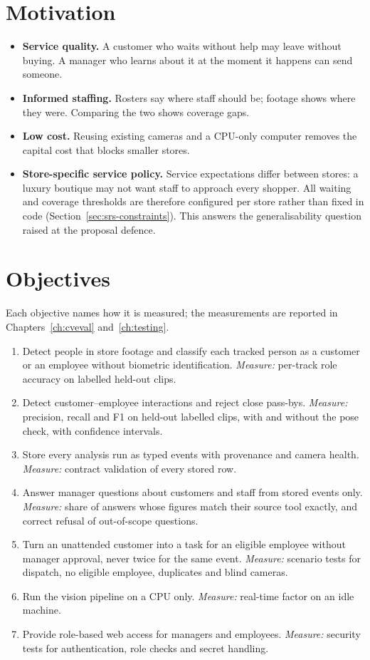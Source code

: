 \section{Motivation}
\begin{itemize}
\item \textbf{Service quality.} A customer who waits without help may leave without buying. A manager who learns about it at the moment it happens can send someone.
\item \textbf{Informed staffing.} Rosters say where staff should be; footage shows where they were. Comparing the two shows coverage gaps.
\item \textbf{Low cost.} Reusing existing cameras and a CPU-only computer removes the capital cost that blocks smaller stores.
\item \textbf{Store-specific service policy.} Service expectations differ between stores: a luxury boutique may not want staff to approach every shopper. All waiting and coverage thresholds are therefore configured per store rather than fixed in code (Section~\ref{sec:srs-constraints}). This answers the generalisability question raised at the proposal defence.
\end{itemize}

\section{Objectives}
Each objective names how it is measured; the measurements are reported in Chapters~\ref{ch:cveval} and~\ref{ch:testing}.
\begin{enumerate}[label=O\arabic*.]
\item Detect people in store footage and classify each tracked person as a customer or an employee without biometric identification. \emph{Measure:} per-track role accuracy on labelled held-out clips.
\item Detect customer--employee interactions and reject close pass-bys. \emph{Measure:} precision, recall and F1 on held-out labelled clips, with and without the pose check, with confidence intervals.
\item Store every analysis run as typed events with provenance and camera health. \emph{Measure:} contract validation of every stored row.
\item Answer manager questions about customers and staff from stored events only. \emph{Measure:} share of answers whose figures match their source tool exactly, and correct refusal of out-of-scope questions.
\item Turn an unattended customer into a task for an eligible employee without manager approval, never twice for the same event. \emph{Measure:} scenario tests for dispatch, no eligible employee, duplicates and blind cameras.
\item Run the vision pipeline on a CPU only. \emph{Measure:} real-time factor on an idle machine.
\item Provide role-based web access for managers and employees. \emph{Measure:} security tests for authentication, role checks and secret handling.
\end{enumerate}

